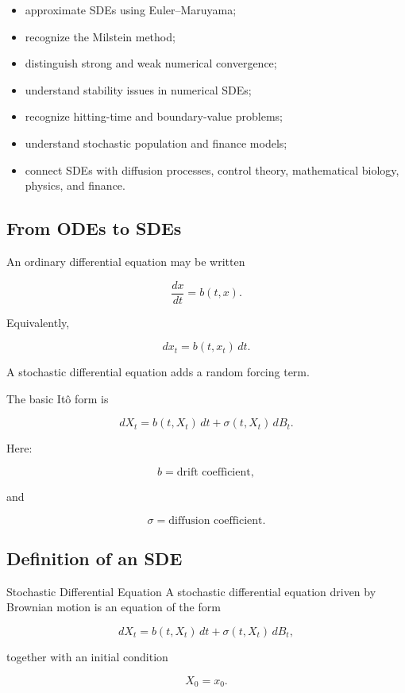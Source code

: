 {\begin{itemize}
    \item approximate SDEs using Euler--Maruyama;
    \item recognize the Milstein method;
    \item distinguish strong and weak numerical convergence;
    \item understand stability issues in numerical SDEs;
    \item recognize hitting-time and boundary-value problems;
    \item understand stochastic population and finance models;
    \item connect SDEs with diffusion processes, control theory,
          mathematical biology, physics, and finance.
\end{itemize}
}

\subsection{From ODEs to SDEs}
\label{subsec:from-odes-to-sdes}

An ordinary differential equation may be written

\[
\boxed{
\frac{dx}{dt}
=
b(t,x).
}
\]

Equivalently,

\[
\boxed{
dx_t
=
b(t,x_t)\,dt.
}
\]

A stochastic differential equation adds a random forcing term.

The basic It\^o form is

\[
\boxed{
dX_t
=
b(t,X_t)\,dt
+
\sigma(t,X_t)\,dB_t.
}
\]

Here:

\[
b
=
\text{drift coefficient},
\]

and

\[
\sigma
=
\text{diffusion coefficient}.
\]

\subsection{Definition of an SDE}
\label{subsec:sde-definition}

\begin{definitionbox}{Stochastic Differential Equation}
A stochastic differential equation driven by Brownian motion is an
equation of the form

\[
\boxed{
dX_t
=
b(t,X_t)\,dt
+
\sigma(t,X_t)\,dB_t,
}
\]

together with an initial condition

\[
\boxed{
X_0=x_0.
}
\]
\end{definitionbox}

